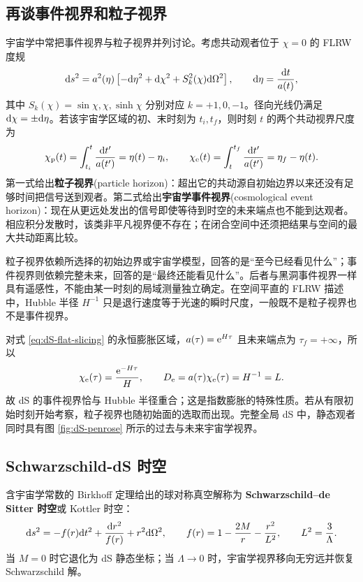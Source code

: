 \subsection{再谈事件视界和粒子视界}

宇宙学中常把事件视界与粒子视界并列讨论。考虑共动观者位于 $\chi=0$ 的 FLRW 度规
\begin{equation}\label{eq:flrw-conformal-radial}
    \dd s^2=a^2(\eta)
      \left[-\dd\eta^2+\dd\chi^2+S_k^2(\chi)\dd\Omega^2\right],
    \qquad \dd\eta=\frac{\dd t}{a(t)},
\end{equation}
其中 $S_k(\chi)=\sin\chi,\chi,\sinh\chi$ 分别对应 $k=+1,0,-1$。径向光线仍满足 $\dd\chi=\pm\dd\eta$。若该宇宙学区域的初、末时刻为 $t_i,t_f$，则时刻 $t$ 的两个共动视界尺度为
\begin{equation}\label{eq:particle-event-horizon}
    \chi_{\rm p}(t)=\int_{t_i}^{t}\frac{\dd t'}{a(t')}
      =\eta(t)-\eta_i,
    \qquad
    \chi_{\rm e}(t)=\int_t^{t_f}\frac{\dd t'}{a(t')}
      =\eta_f-\eta(t).
\end{equation}
第一式给出\textbf{粒子视界}(particle horizon)：超出它的共动源自初始边界以来还没有足够时间把信号送到观者。第二式给出\textbf{宇宙学事件视界}(cosmological event horizon)：现在从更远处发出的信号即使等待到时空的未来端点也不能到达观者。相应积分发散时，该类非平凡视界便不存在；在闭合空间中还须把结果与空间的最大共动距离比较。

粒子视界依赖所选择的初始边界或宇宙学模型，回答的是“至今已经看见什么”；事件视界则依赖完整未来，回答的是“最终还能看见什么”。后者与黑洞事件视界一样具有遥感性，不能由某一时刻的局域测量独立确定。在空间平直的 FLRW 描述中，Hubble 半径 $H^{-1}$ 只是退行速度等于光速的瞬时尺度，一般既不是粒子视界也不是事件视界。

对式 \eqref{eq:dS-flat-slicing} 的永恒膨胀区域，$a(\tau)=\mathrm{e}^{H\tau}$ 且未来端点为 $\tau_f=+\infty$，所以
\[
    \chi_{\rm e}(\tau)=\frac{\mathrm{e}^{-H\tau}}{H},
    \qquad D_{\rm e}=a(\tau)\chi_{\rm e}(\tau)=H^{-1}=L.
\]
故 dS 的事件视界恰与 Hubble 半径重合；这是指数膨胀的特殊性质。若从有限初始时刻开始考察，粒子视界也随初始面的选取而出现。完整全局 dS 中，静态观者同时具有图 \ref{fig:dS-penrose} 所示的过去与未来宇宙学视界。

\subsection{Schwarzschild-dS 时空}

含宇宙学常数的 Birkhoff 定理给出的球对称真空解称为 \textbf{Schwarzschild--de Sitter 时空}或 Kottler 时空：
\begin{equation}\label{eq:schwarzschild-dS}
    \dd s^2=-f(r)\dd t^2+\frac{\dd r^2}{f(r)}+r^2\dd\Omega^2,
    \qquad
    f(r)=1-\frac{2M}{r}-\frac{r^2}{L^2},
    \qquad L^2=\frac3\Lambda.
\end{equation}
当 $M=0$ 时它退化为 dS 静态坐标；当 $\Lambda\to0$ 时，宇宙学视界移向无穷远并恢复 Schwarzschild 解。

